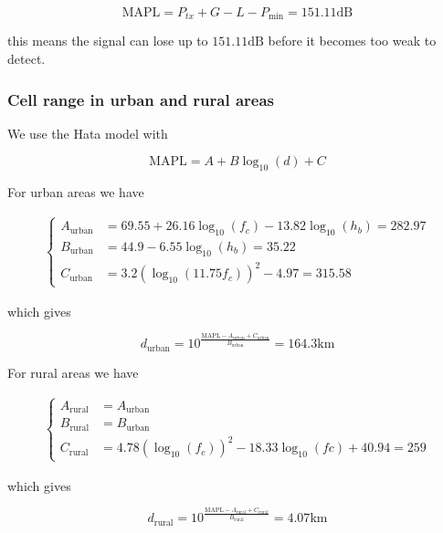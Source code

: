 \documentclass[]{article}
\begin{document}
	\begin{equation}
		\text{MAPL} = P_{tx} + G - L - P_{\text{min}} = 151.11\text{dB}
	\end{equation}
	
	this means the signal can lose up to $151.11\text{dB}$ before it becomes too weak to detect.

	\subsubsection*{Cell range in urban and rural areas}
	
	We use the Hata model with
	
	\begin{equation}
		\text{MAPL} = A + B\log_{10}(d) + C
	\end{equation}
	
	For urban areas we have
	
	\begin{align}
		\begin{cases}
			A_{\text{urban}} &= 69.55 + 26.16\log_{10}(f_c) - 13.82\log_{10}(h_b) = 282.97 \\
			B_{\text{urban}} &= 44.9 - 6.55\log_{10}(h_b) = 35.22 \\
			C_{\text{urban}} &= 3.2(\log_{10}(11.75f_c))^2 - 4.97 = 315.58
		\end{cases}
	\end{align}
	
	which gives
	
	\begin{equation}
		d_{\text{urban}} = 10^{\frac{\text{MAPL} - A_{\text{urban}} + C_{\text{urban}}}{B_{\text{urban}}}} = 164.3\text{km}
	\end{equation}
	
	For rural areas we have
	
	\begin{align}
		\begin{cases}
			A_{\text{rural}} &= A_{\text{urban}} \\
			B_{\text{rural}} &= B_{\text{urban}} \\
			C_{\text{rural}} &= 4.78(\log_{10}(f_c))^2 - 18.33\log_{10}(fc) + 40.94 = 259
		\end{cases}
	\end{align}
	
	which gives
	
	\begin{equation}
		d_{\text{rural}} = 10^{\frac{\text{MAPL} - A_{\text{rural}} + C_{\text{rural}}}{B_{\text{rural}}}} = 4.07\text{km}
	\end{equation}
\end{document}
